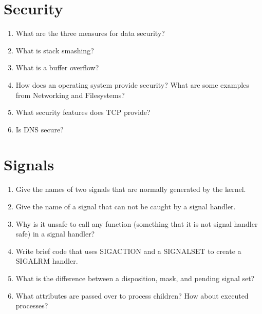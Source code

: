 \section{Security}

\begin{enumerate}
\item What are the three measures for data security?
\item What is stack smashing?
\item What is a buffer overflow?
\item How does an operating system provide security? What are some examples from Networking and Filesystems?
\item What security features does TCP provide?
\item Is DNS secure?
\end{enumerate}

\section{Signals}

\begin{enumerate}
\item Give the names of two signals that are normally generated by the kernel.
\item Give the name of a signal that can not be caught by a signal handler.
\item Why is it unsafe to call any function (something that it is not signal handler safe) in a signal handler?
\item Write brief code that uses SIGACTION and a SIGNALSET to create a SIGALRM handler.
\item What is the difference between a disposition, mask, and pending signal set?
\item What attributes are passed over to process children? How about executed processes?
\end{enumerate}
